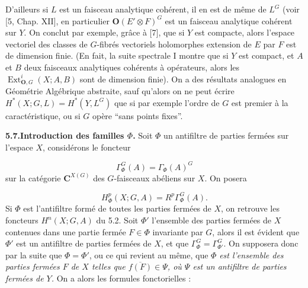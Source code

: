 D'ailleurs si $L$ est un faisceau analytique cohérent, il en est de même de
$L^G$ (voir [5, Chap. XII], en particulier ${\mathbf O}(E'\otimes F)^G$ est un faisceau
analytique cohérent sur $Y$.
On conclut par exemple, grâce à [7], que si $Y$ est compacte, alors l'espace
vectoriel des classes de $G$-fibrés vectoriels holomorphes extension de $E$
par $F$ est de dimension finie. (En fait, la suite spectrale I montre que si
$Y$ est compact, et $A$ et $B$ deux faisceaux analytiques cohérents à
opérateurs, alors les $\operatorname{Ext}_{{\mathbf O},G}^{i}(X;A,B)$ sont de dimension
finie).
On a des résultats analogues en Géométrie Algébrique abstraite, sauf qu'alors
on ne peut écrire $H^*(X;G,L)=H^*(Y,L^G)$ que si par exemple l'ordre de $G$
est premier à la caractéristique, ou si $G$ opère ``sans points fixes''.

\textbf{5.7.\quad Introduction des familles $\Phi$.}
Soit $\Phi$ un antifiltre de parties fermées sur l'espace $X$, considérons le
foncteur

\begin{equation}
\Gamma_\Phi^G(A)=\Gamma_\Phi(A)^G
\tag{5.7.1}
\end{equation}
sur la catégorie ${\mathbf C}^{X(G)}$ des $G$-faisceaux abéliens sur $X$. On posera

\begin{equation}
H_\Phi^p(X;G,A)=R^p\Gamma_\Phi^G(A).
\tag{5.7.2}
\end{equation}
Si $\Phi$ est l'antifiltre formé de toutes les parties fermées de $X$, on
retrouve les foncteurs $H^n(X;G,A)$ du 5.2. Soit $\Phi'$ l'ensemble des
parties fermées de $X$ contenues dans une partie fermée $F\in\Phi$ invariante
par $G$, alors il est évident que $\Phi'$ est un antifiltre de parties fermées
de $X$, et que $\Gamma_\Phi^G=\Gamma_{\Phi'}^G$. On supposera donc par la suite
que $\Phi=\Phi'$, ou ce qui revient au même, que $\Phi$ \textit{est l'ensemble des
parties fermées $F$ de $X$ telles que $\overline{f(F)}\in\Psi$, où $\Psi$ est
un antifiltre de parties fermées de $Y$.}
On a alors les formules fonctorielles :

